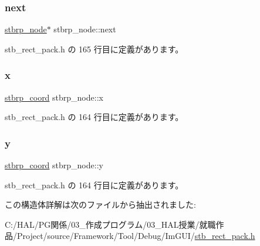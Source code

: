 \subsubsection{\texorpdfstring{next}{next}}
{\footnotesize\ttfamily \mbox{\hyperlink{structstbrp__node}{stbrp\+\_\+node}}$\ast$ stbrp\+\_\+node\+::next}



 stb\+\_\+rect\+\_\+pack.\+h の 165 行目に定義があります。

\mbox{\label{structstbrp__node_a45ab31a88025db27d08040d715b129ea}} 
\subsubsection{\texorpdfstring{x}{x}}
{\footnotesize\ttfamily \mbox{\hyperlink{stb__rect__pack_8h_ac2c2491b95dea6a298b7423dc762dfd9}{stbrp\+\_\+coord}} stbrp\+\_\+node\+::x}



 stb\+\_\+rect\+\_\+pack.\+h の 164 行目に定義があります。

\mbox{\label{structstbrp__node_ad0415cb102a4f37aa45073653307e67e}} 
\subsubsection{\texorpdfstring{y}{y}}
{\footnotesize\ttfamily \mbox{\hyperlink{stb__rect__pack_8h_ac2c2491b95dea6a298b7423dc762dfd9}{stbrp\+\_\+coord}} stbrp\+\_\+node\+::y}



 stb\+\_\+rect\+\_\+pack.\+h の 164 行目に定義があります。



この構造体詳解は次のファイルから抽出されました\+:\begin{DoxyCompactItemize}
\item 
C\+:/\+H\+A\+L/\+P\+G関係/03\+\_\+作成プログラム/03\+\_\+\+H\+A\+L授業/就職作品/\+Project/source/\+Framework/\+Tool/\+Debug/\+Im\+G\+U\+I/\mbox{\hyperlink{stb__rect__pack_8h}{stb\+\_\+rect\+\_\+pack.\+h}}\end{DoxyCompactItemize}
